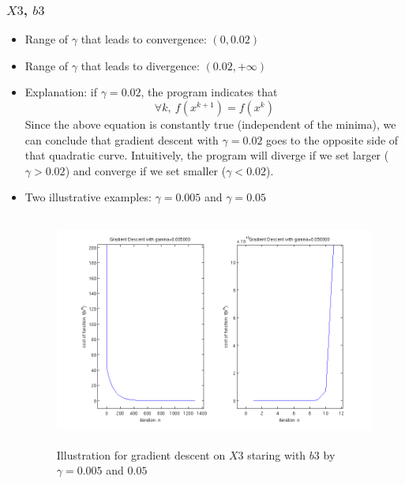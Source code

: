 \documentclass[11pt,a4paper]{article}
\begin{document}
\subsubsection{$X3$, $b3$}
\begin{itemize}
    \item Range of $\gamma$ that leads to convergence: $(0,0.02)$
    \item Range of $\gamma$ that leads to divergence: $(0.02,+\infty)$
    \item Explanation: if $\gamma = 0.02$, the program indicates that 
        $$ \forall k,\ f(x^{k+1}) = f(x^{k})$$ 
        Since the above equation is constantly true (independent of the
        minima), we can conclude that gradient descent with $\gamma = 0.02$ goes 
        to the opposite side of that quadratic curve. Intuitively, the program 
        will diverge if we set larger ($\gamma>0.02$) and converge if we set smaller
        ($\gamma<0.02$).
    \item Two illustrative examples: $\gamma = 0.005$ and $\gamma = 0.05$
        \begin{figure}[h]
            \centering
            \includegraphics[width=6in,height=3in]{../ps1_matlab/3.png}
            \caption{Illustration for gradient descent on $X3$ staring with
                $b3$ by $\gamma = 0.005$ and $0.05$}
        \end{figure}
\end{itemize}

\newpage
\end{document}
